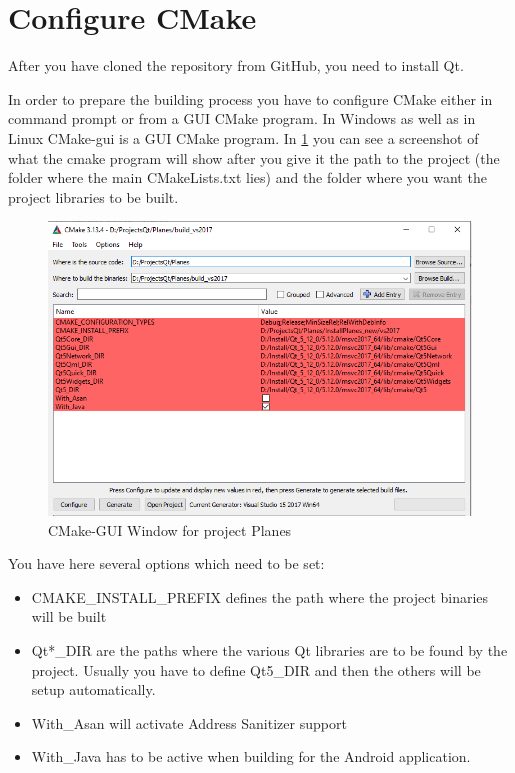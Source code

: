 \section{Configure CMake}

After you have cloned the repository from GitHub, you need to install Qt.

In order to prepare the building process you have to configure CMake either in command prompt or from a GUI CMake program. In Windows as well as in Linux CMake-gui is a GUI CMake program. In \ref{fig:cmakegui_planes} you can see a screenshot of what the cmake program will show after you give it the path to the project (the folder where the main CMakeLists.txt lies) and the folder where you want the project libraries to be built.


\begin{figure}[h]
	\includegraphics[width = \textwidth]{PlanesCPlusPlus_CMAKE_GUI_Window.png}
	\caption{CMake-GUI Window for project Planes}
	\label{fig:cmakegui_planes}
\end{figure}

You have here several options which need to be set:

\begin{itemize}
	\item CMAKE\_INSTALL\_PREFIX defines the path where the project binaries will be built
	\item Qt*\_DIR are the paths where the various Qt libraries are to be found by the project. Usually you have to define Qt5\_DIR and then the others will be setup automatically.
	\item With\_Asan will activate Address Sanitizer support
	\item With\_Java has to be active when building for the Android application.
\end{itemize}

